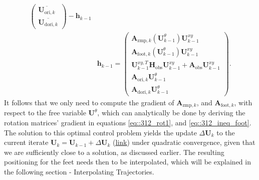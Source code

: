 \begin{align}
\begin{pmatrix}
		\overline{\bm{U}_{\text{ori},k}}\\
		\overline{\bm{U}_{\text{dori},k}}
	\end{pmatrix}-\bm{h}_{k-1}\\
	&\bm{h}_{k-1} =\begin{pmatrix}
		\bm{A}_{\text{zmp},k}(\bm{U}^\theta_{k-1})\bm{U}_{k-1}^{xy} \\
		\bm{A}_{\text{foot},k}(\bm{U}^\theta_{k-1})\bm{U}_{k-1}^{xy} \\
		\bm{U}_{k-1}^{xy,T}\bm{H}_{\text{obs}}\bm{U}_{k-1}^{xy}+\bm{A}_{\text{obs}}\bm{U}_{k-1}^{xy} \\
		\bm{A}_{\text{ori},k}\bm{U}_{k-1}^\theta\\
		\bm{A}_{\text{dori},k}\bm{U}_{k-1}^\theta
	\end{pmatrix}.
\end{align}
It follows that we only need to compute the gradient of $\bm{A}_{\text{zmp},k}$, and $\bm{A}_{\text{foot},k}$, with respect to the free variable $\bm{U}^{\theta}$, which can analytically be done by deriving the rotation matrices' gradient in equations \ref{eq::312_rot1}, and \ref{eq::312_ineq_foot}. The solution to this optimal control problem yields the update $\Delta\bm{U}_k$ to the current iterate $\bm{U}_k=\bm{U}_{k-1}+\Delta\bm{U}_k$ (\href{https://github.com/mhubii/nmpc_pattern_generator/blob/dc1f5a9366cbbbf76f1b02cada642f6ac9a04c89/libs/pattern_generator/src/nmpc_generator.cpp#L155}{\underline{link}}) under quadratic convergence, given that we are sufficiently close to a solution, as discussed earlier. The resulting positioning for the feet needs then to be interpolated, which will be explained in the following section - Interpolating Trajectories. 